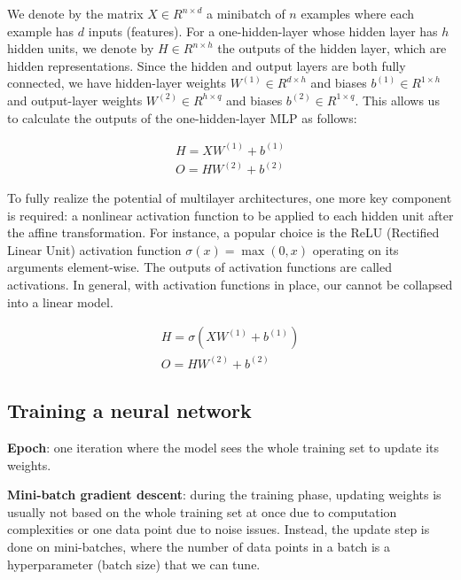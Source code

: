 We denote by the matrix $X \in R^{n \times d}$ a minibatch of $n$ examples where each example has $d$ inputs (features). 
For a one-hidden-layer  whose hidden layer has $h$ hidden units, we denote by $H \in R^{n \times h}$ the outputs of the hidden layer, which are hidden representations. 
Since the hidden and output layers are both fully connected, we have hidden-layer weights $W^{(1)} \in R^{d \times h}$ and biases $b^{(1)} \in R^{1 \times h}$ and output-layer weights $W^{(2)} \in R^{h \times q}$ and biases $b^{(2)} \in R^{1 \times q}$. 
This allows us to calculate the outputs  of the one-hidden-layer MLP as follows:

\begin{equation}
\begin{aligned}
   H = X W^{(1)} + b^{(1)} \\
   O = H W^{(2)} + b^{(2)}
\end{aligned}
\end{equation}

To fully realize the potential of multilayer architectures, one more key component is required: a nonlinear activation function to be applied to each hidden unit after the affine transformation.
For instance, a popular choice is the ReLU (Rectified Linear Unit) activation function \cite{relu} $\sigma (x) = \max (0, x)$ operating on its arguments element-wise. 
The outputs of activation functions are called activations. 
In general, with activation functions in place, our  cannot be collapsed into a linear model.

\begin{equation}
\begin{aligned}
   H = \sigma (X W^{(1)} + b^{(1)}) \\
   O = H W^{(2)} + b^{(2)}
\end{aligned}
\end{equation}


\subsection{Training a neural network}

\textbf{Epoch}: one iteration where the model sees the whole training set to update its weights.

\textbf{Mini-batch gradient descent}: during the training phase, updating weights is usually not based on the whole training set at once due to computation complexities or one data point due to noise issues. 
Instead, the update step is done on mini-batches, where the number of data points in a batch is a hyperparameter (batch size) that we can tune.

